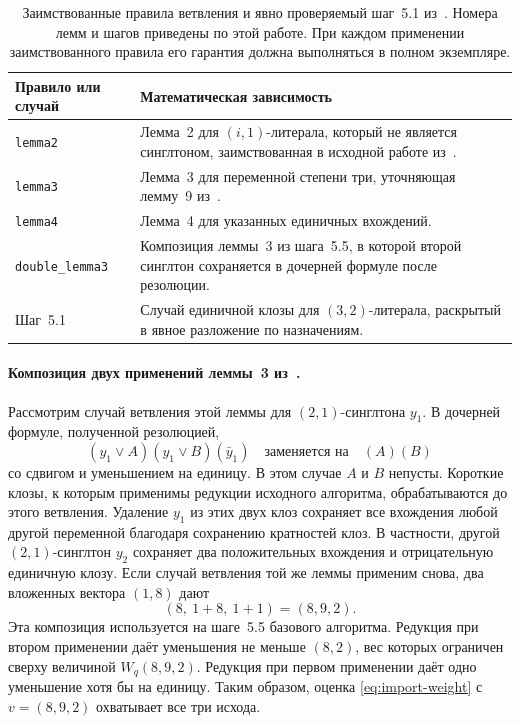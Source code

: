 \documentclass[10pt,twoside]{article}
\theoremstyle{definition}
\theoremstyle{remark}
\begin{document}
\begin{table}[!htbp]
\centering\small
\begin{tabularx}{\linewidth}{@{}lX@{}}
\toprule
Правило или случай & Математическая зависимость \\
\midrule
\texttt{lemma2} & Лемма~2 для $(i,1)$-литерала, который не является
синглтоном, заимствованная в исходной работе из~\cite{XuEtAl2019}. \\
\texttt{lemma3} & Лемма~3 для переменной степени три, уточняющая
лемму~9 из~\cite{XuEtAl2019}. \\
\texttt{lemma4} & Лемма~4 для указанных единичных вхождений. \\
\texttt{double\_lemma3} & Композиция леммы~3 из шага~5.5,
в которой второй синглтон сохраняется в дочерней формуле после
резолюции. \\
Шаг~5.1 & Случай единичной клозы для $(3,2)$-литерала, раскрытый
в явное разложение по назначениям. \\
\bottomrule
\end{tabularx}
\caption{Заимствованные правила ветвления и явно проверяемый
шаг~5.1 из~\cite{Xiao2022}. Номера лемм и шагов приведены по этой работе.
При каждом применении заимствованного правила его гарантия должна
выполняться в полном экземпляре.}
\label{tab:dependencies}
\end{table}

\paragraph{Композиция двух применений леммы~3 из~\cite{Xiao2022}.}
Рассмотрим случай ветвления этой леммы для $(2,1)$-синглтона $y_1$.
В дочерней формуле, полученной резолюцией,
\[
 (y_1\vee A)(y_1\vee B)(\bar y_1)
 \quad\text{заменяется на}\quad (A)(B)
\]
со сдвигом и уменьшением на единицу. В этом случае $A$ и $B$ непусты.
Короткие клозы, к которым применимы редукции исходного алгоритма,
обрабатываются до этого ветвления. Удаление $y_1$ из этих двух клоз
сохраняет все вхождения любой другой переменной благодаря сохранению
кратностей клоз. В частности, другой $(2,1)$-синглтон $y_2$ сохраняет
два положительных вхождения и отрицательную единичную клозу. Если
случай ветвления той же леммы применим снова, два вложенных вектора
$(1,8)$ дают
\[
 (8,\ 1+8,\ 1+1)=(8,9,2).
\]
Эта композиция используется на шаге~5.5 базового алгоритма. Редукция
при втором применении даёт уменьшения не меньше $(8,2)$, вес которых
ограничен сверху величиной $W_q(8,9,2)$. Редукция при первом применении
даёт одно уменьшение хотя бы на единицу. Таким образом, оценка
\eqref{eq:import-weight} с $v=(8,9,2)$ охватывает все три исхода.
\end{document}
